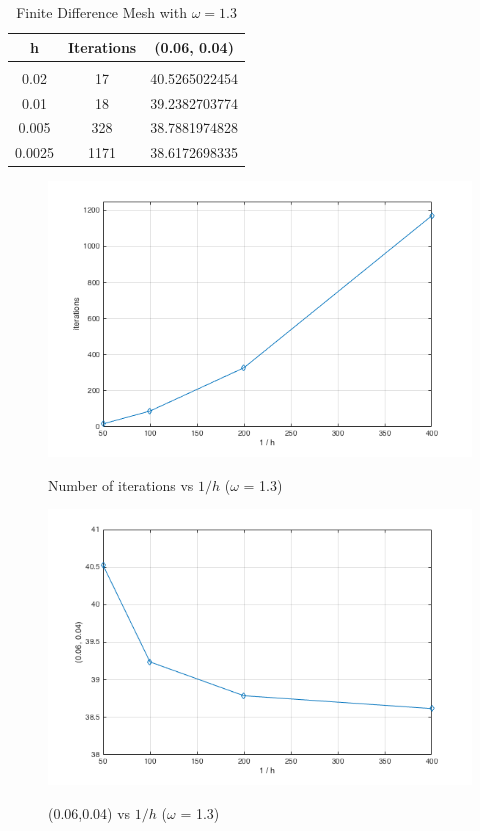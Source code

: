 \documentclass[11pt]{amsart}
\begin{document}
\begin{table}[h!]
    \caption{Finite Difference Mesh with $\omega =1.3$}
    \label{tbl:fdm_mesh_2}
    \begin{tabular}{ c | c | c}
    	\textbf{h} & \textbf{Iterations} & \textbf{(0.06, 0.04)}\\ \hline \\
	0.02 & 17 & 40.5265022454\\
	0.01 & 18 & 39.2382703774\\
	0.005 & 328 & 38.7881974828\\
	0.0025 & 1171 & 38.6172698335
    \end{tabular}
\end{table}
\begin{center}
	\begin{figure}[h]
		\caption{Number of iterations vs $1 / h$ ($\omega$ = 1.3)}
		\includegraphics[width=\textwidth]{assets/itr_v_1_o_h.png}\label{fig:itr_vs_1_o_h}
	\end{figure}
\end{center}
\begin{center}
	\begin{figure}[h]
		\caption{(0.06,0.04) vs $1 / h$ ($\omega$ = 1.3)}
		\includegraphics[width=\textwidth]{assets/point_v_1_o_h.png}\label{fig:point_vs_1_o_h}
	\end{figure}
\end{center}
\end{document}
